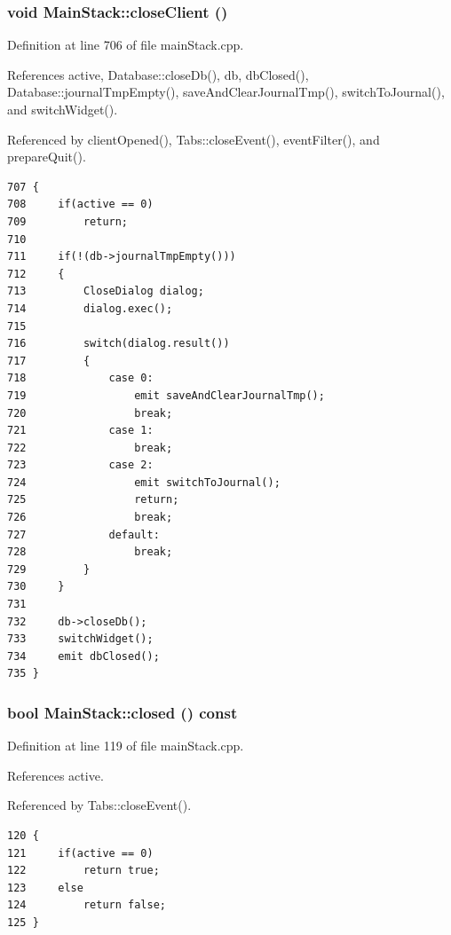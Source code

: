 \hypertarget{classMainStack_i0}{
\subsubsection[closeClient]{\setlength{\rightskip}{0pt plus 5cm}void Main\-Stack::close\-Client ()}}
\label{classMainStack_i0}


Definition at line 706 of file main\-Stack.cpp.

References active, Database::close\-Db(), db, db\-Closed(), Database::journal\-Tmp\-Empty(), save\-And\-Clear\-Journal\-Tmp(), switch\-To\-Journal(), and switch\-Widget().

Referenced by client\-Opened(), Tabs::close\-Event(), event\-Filter(), and prepare\-Quit().

\footnotesize\begin{verbatim}707 {
708     if(active == 0)
709         return;
710 
711     if(!(db->journalTmpEmpty()))
712     {
713         CloseDialog dialog;
714         dialog.exec();
715 
716         switch(dialog.result())
717         {
718             case 0:
719                 emit saveAndClearJournalTmp();
720                 break;
721             case 1:
722                 break;
723             case 2:
724                 emit switchToJournal();
725                 return;
726                 break;
727             default:
728                 break;
729         }
730     }
731 
732     db->closeDb();
733     switchWidget();
734     emit dbClosed();
735 }
\end{verbatim}\normalsize 


\hypertarget{classMainStack_a2}{
\subsubsection[closed]{\setlength{\rightskip}{0pt plus 5cm}bool Main\-Stack::closed () const}}
\label{classMainStack_a2}


Definition at line 119 of file main\-Stack.cpp.

References active.

Referenced by Tabs::close\-Event().

\footnotesize\begin{verbatim}120 {
121     if(active == 0)
122         return true;
123     else
124         return false;
125 }
\end{verbatim}\normalsize 


